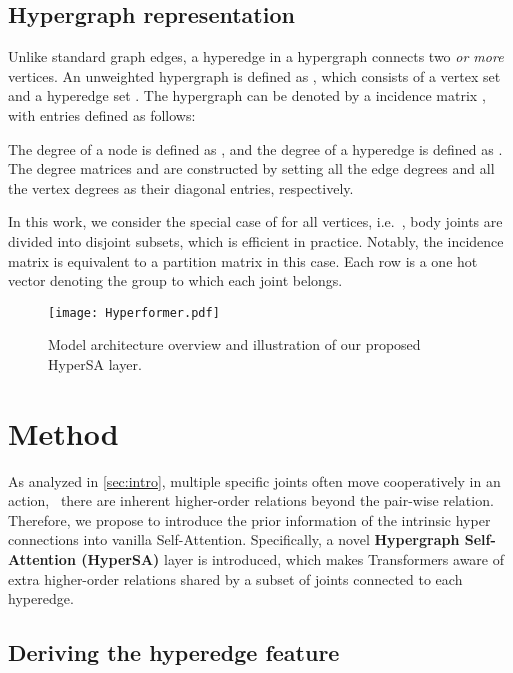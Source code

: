 \documentclass[10pt,twocolumn,letterpaper]{article}
\begin{document}
\subsection{Hypergraph representation}

Unlike standard graph edges, a hyperedge in a hypergraph connects
two \emph{or more} vertices. An unweighted hypergraph is defined as , which consists of a vertex set  and a hyperedge set . The hypergraph  can be denoted by a  incidence matrix , with entries defined as follows:

The degree of a node  is defined as , and the degree of a hyperedge  is defined
as . The degree matrices  and  are constructed by setting all the edge degrees and all the vertex degrees as their diagonal entries,
respectively.

In this work, we consider the special case of  for all vertices, i.e.~, body joints are divided into  disjoint subsets, which is efficient in practice. Notably, the incidence matrix  is equivalent to a partition matrix in this case.
Each row is a one hot vector denoting the group to which each joint belongs.





\begin{figure*}[ht]
  \centering

      \texttt{[image: Hyperformer.pdf]}
     \caption{Model architecture overview and illustration of our proposed HyperSA layer.}
     \label{fig:model}
\end{figure*}


\section{Method}
As analyzed in \cref{sec:intro}, multiple specific joints often move cooperatively in an action, \ie~there are inherent higher-order relations beyond the pair-wise relation. Therefore, we propose to introduce the prior information of the intrinsic hyper connections into vanilla Self-Attention. Specifically, a novel \textbf{Hypergraph Self-Attention (HyperSA)} layer is introduced, which makes Transformers aware of extra higher-order relations shared by a subset of joints connected to each hyperedge. 

\subsection{Deriving the hyperedge feature}
\end{document}
